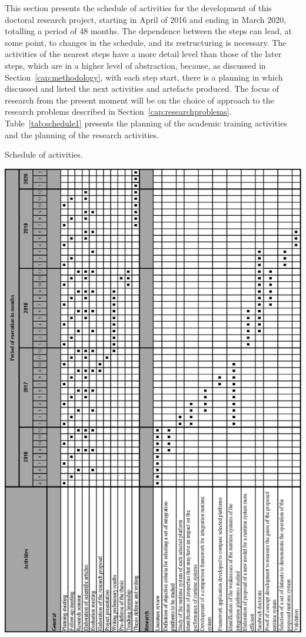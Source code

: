 \label{cap:schedule}
\noindent 

This section presents the schedule of activities for the development of this doctoral research project, starting in April of 2016 and ending in March 2020, totalling a period of 48 months. The dependence between the steps can lead, at some point, to changes in the schedule, and its restructuring is necessary. The activities of the nearest steps have a more detail level than those of the later steps, which are in a higher level of abstraction, because, as discussed in Section~\ref{cap:methodology}, with each step start, there is a planning in which discussed and listed the next activities and artefacts produced.
The focus of research from the present moment will be on the choice of approach to the research problems described in  Section~\ref{cap:researchproblems}.
Table~\ref{tab:schedule1} presents the planning of the academic training activities and the planning of the research activities.

\begin{table}[htbp]
	\centering
	\caption{Schedule of activities.}
    \includegraphics[scale=0.95]{./figs/schedule.eps}
	\label{tab:schedule1}
\end{table}

